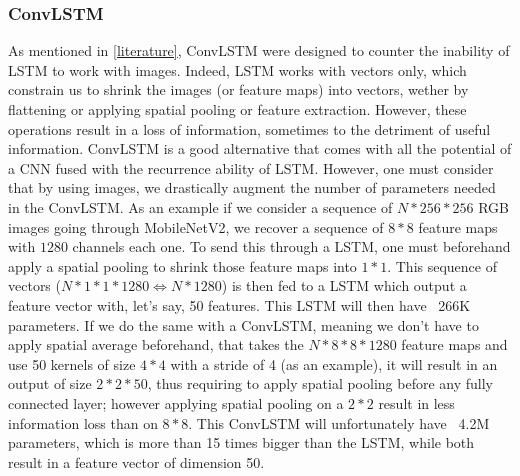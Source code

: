 \documentclass[12pt, a4paper]{report}
\begin{document}
				\subsubsection{ConvLSTM}
					As mentioned in \ref{literature}, ConvLSTM were designed to counter the inability of LSTM to work with images.
					Indeed, LSTM works with vectors only, which constrain us to shrink the images (or feature maps) into vectors, wether by flattening or applying spatial pooling or feature extraction.
					However, these operations result in a loss of information, sometimes to the detriment of useful information.
					ConvLSTM is a good alternative that comes with all the potential of a CNN fused with the recurrence ability of LSTM.
					However, one must consider that by using images, we drastically augment the number of parameters needed in the ConvLSTM.
					As an example if we consider a sequence of $N*256*256$ RGB images going through MobileNetV2, we recover a sequence of $8*8$ feature maps with $1280$ channels each one.
					To send this through a LSTM, one must beforehand apply a spatial pooling to shrink those feature maps into $1*1$.
					This sequence of vectors ($N*1*1*1280 \Leftrightarrow N*1280$) is then fed to a LSTM which output a feature vector with, let's say, 50 features.
					This LSTM will then have ~266K parameters.
					If we do the same with a ConvLSTM, meaning we don't have to apply spatial average beforehand, that takes the $N*8*8*1280$ feature maps and use 50 kernels of size $4*4$ with a stride of 4 (as an example), it will result in an output of size $2*2*50$, thus requiring to apply spatial pooling before any fully connected layer; however applying spatial pooling on a $2*2$ result in less information loss than on $8*8$.
					This ConvLSTM will unfortunately have ~4.2M parameters, which is more than 15 times bigger than the LSTM, while both result in a feature vector of dimension 50.
\end{document}
